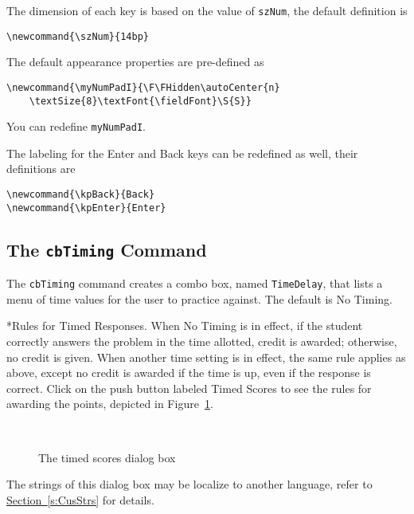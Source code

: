 \documentclass{article}
\makeatletter
\let\uif\textsf
\let\bslash=\@backslashchar
\renewcommand{\paragraph}{\@startsection{paragraph}{4}{0pt}{6pt}{-3pt}{\bfseries}}
\def\cs#1{\texttt{\bslash#1}}
\makeatother
\begin{document}
The dimension of each key is based on the value of \cs{szNum}, the default definition is
\begin{Verbatim}[xleftmargin=\amtIndent]
\newcommand{\szNum}{14bp}
\end{Verbatim}
The default appearance properties are pre-defined as
\begin{Verbatim}[xleftmargin=\amtIndent]
\newcommand{\myNumPadI}{\F\FHidden\autoCenter{n}
    \textSize{8}\textFont{\fieldFont}\S{S}}
\end{Verbatim}
You can redefine \cs{myNumPadI}.

The labeling for the \uif{Enter} and \uif{Back} keys can be redefined as well, their definitions are
\begin{Verbatim}[xleftmargin=\amtIndent]
\newcommand{\kpBack}{Back}
\newcommand{\kpEnter}{Enter}
\end{Verbatim}

\subsection{The \texorpdfstring{\protect\cs{cbTiming}}{} Command}\label{cbTiming}

The \cs{cbTiming} command creates a combo box, named \texttt{TimeDelay}, that
lists a menu of time values for the user to practice against. The default is
\uif{No Timing}.

\paragraph*{Rules for Timed Responses.} When \uif{No Timing} is in effect,
if the student correctly answers the problem in the time allotted, credit is
awarded; otherwise, no credit is given. When another time setting is in
effect, the same rule applies as above, except no credit is awarded if the
time is up, even if the response is correct. Click on the push button labeled
\uif{Timed Scores} to see the rules for awarding the points, depicted in Figure~\ref*{fig:timedscores}.

\begin{figure}[htb]\centering
\setlength{\fboxsep}{0pt}
\\
\caption{The timed scores dialog box}\label{fig:timedscores}
\end{figure}

The strings of this dialog box may be localize to another language, refer to \hyperref[s:CusStrs]{Section~\ref*{s:CusStrs}}
for details.
\end{document}
